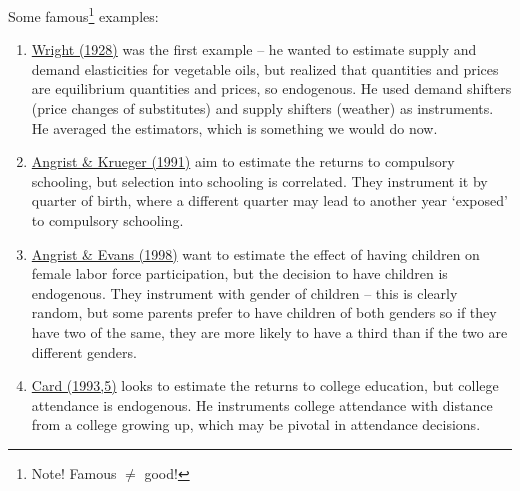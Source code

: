 \documentclass[10pt]{article}
\begin{document}
\begin{example}
	Some famous\footnote{Note! Famous $\ne $ good!} examples:
	\begin{enumerate}
		\item \href{https://scholar.harvard.edu/files/stock/files/tariff_appendixb.pdf}{Wright (1928)} was the first example -- he wanted to estimate supply and demand elasticities for vegetable oils, but realized that quantities and prices are equilibrium quantities and prices, so endogenous. He used demand shifters (price changes of substitutes) and supply shifters (weather) as instruments. He averaged the estimators, which is something we would do now.
		\item \href{https://www.jstor.org/stable/2937954?seq=1}{Angrist \& Krueger (1991)} aim to estimate the returns to compulsory schooling, but selection into schooling is correlated. They instrument it by quarter of birth, where a different quarter may lead to another year `exposed' to compulsory schooling.
		\item \href{https://www.jstor.org/stable/116844}{Angrist \& Evans (1998)} want to estimate the effect of having children on female labor force participation, but the decision to have children is endogenous. They instrument with gender of children -- this is clearly random, but some parents prefer to have children of both genders so if they have two of the same, they are more likely to have a third than if the two are different genders.
		\item \href{https://davidcard.berkeley.edu/papers/geo_var_schooling.pdf}{Card (1993,5)} looks to estimate the returns to college education, but college attendance is endogenous. He instruments college attendance with distance from a college growing up, which may be pivotal in attendance decisions.
	\end{enumerate}
\end{example}
\end{document}
